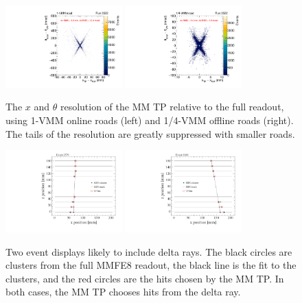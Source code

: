 \begin{figure}[!htpb]
  \begin{center}
    \includegraphics[width=0.4\textwidth]{figures/gbtanalysis3522/TP_xres_angres_full.pdf}
    \includegraphics[width=0.4\textwidth]{figures/gbtanalysis3522/TP_xres_angres.pdf}
  \end{center}
  \vspace{-10pt}
  \caption{The $x$ and $\theta$ resolution of the MM TP relative to the full readout, using 1-VMM online roads (left) and 1/4-VMM offline roads (right). The tails of the resolution are greatly suppressed with smaller roads.}
  \label{fig:xthetares}
\end{figure}

\begin{figure}[!htpb]
  \begin{center}
    \includegraphics[width=0.4\textwidth]{figures/event_displays/display_02579.pdf}
    \includegraphics[width=0.4\textwidth]{figures/event_displays/display_08160.pdf}
  \end{center}
  \vspace{-10pt}
  \caption{Two event displays likely to include delta rays. The black circles are clusters from the full MMFE8 readout, the black line is the fit to the clusters, and the red circles are the hits chosen by the MM TP. In both cases, the MM TP chooses hits from the delta ray.}
  \label{fig:deltarays}
\end{figure}


